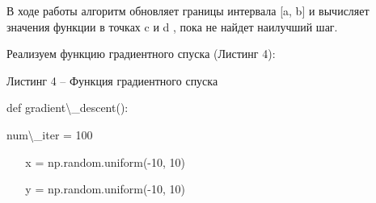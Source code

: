\documentclass{article}%
\begin{document}
\begin{enumerate}
\begin{flushleft}
В ходе работы алгоритм обновляет границы интервала [a, b] и вычисляет значения функции в точках %
c%
и %
d%
, пока не найдет наилучший шаг.%
%
\end{flushleft}%
\begin{flushleft}%
%
\end{flushleft}%
\begin{flushleft}%
%
\end{flushleft}%
\begin{flushleft}%
Реализуем функцию градиентного спуска (Листинг 4):%
%
\end{flushleft}%
\begin{flushleft}%
	Листинг 4 – Функция градиентного спуска%
%
\end{flushleft}%
\begin{flushleft}%
def gradient\textbackslash{}_descent():%
%
\end{flushleft}%
\begin{flushleft}%
    num\textbackslash{}_iter = 100%
%
\end{flushleft}%
\begin{flushleft}%
    x = np.random.uniform(-10, 10)%
%
\end{flushleft}%
\begin{flushleft}%
    y = np.random.uniform(-10, 10)%

\end{flushleft}
\end{enumerate}
\end{document}
